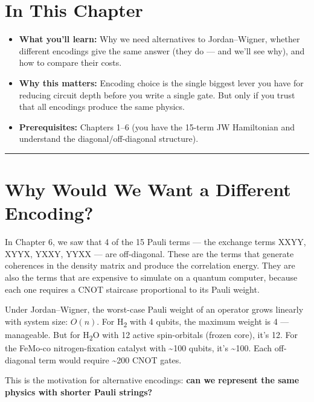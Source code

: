 \documentclass[
  11pt,
  oneside]{book}
\providecommand{\tightlist}{%
  \setlength{\itemsep}{0pt}\setlength{\parskip}{0pt}}
\begin{document}
\section{In This Chapter}\label{in-this-chapter-6}

\begin{itemize}
\tightlist
\item
  \textbf{What you'll learn:} Why we need alternatives to
  Jordan--Wigner, whether different encodings give the same answer (they
  do --- and we'll see why), and how to compare their costs.
\item
  \textbf{Why this matters:} Encoding choice is the single biggest lever
  you have for reducing circuit depth before you write a single gate.
  But only if you trust that all encodings produce the same physics.
\item
  \textbf{Prerequisites:} Chapters 1--6 (you have the 15-term JW
  Hamiltonian and understand the diagonal/off-diagonal structure).
\end{itemize}

\begin{center}\rule{0.5\linewidth}{0.5pt}\end{center}

\section{Why Would We Want a Different
Encoding?}\label{why-would-we-want-a-different-encoding}

In Chapter 6, we saw that 4 of the 15 Pauli terms --- the exchange terms
XXYY, XYYX, YXXY, YYXX --- are off-diagonal. These are the terms that
generate coherences in the density matrix and produce the correlation
energy. They are also the terms that are expensive to simulate on a
quantum computer, because each one requires a CNOT staircase
proportional to its Pauli weight.

Under Jordan--Wigner, the worst-case Pauli weight of an operator grows
linearly with system size: \(O(n)\). For H\textsubscript{2} with 4 qubits, the maximum
weight is 4 --- manageable. But for H\textsubscript{2}O with 12 active spin-orbitals
(frozen core), it's 12. For the FeMo-co nitrogen-fixation catalyst with
\textasciitilde100 qubits, it's \textasciitilde100. Each off-diagonal
term would require \textasciitilde200 CNOT gates.

This is the motivation for alternative encodings: \textbf{can we
represent the same physics with shorter Pauli strings?}
\end{document}
